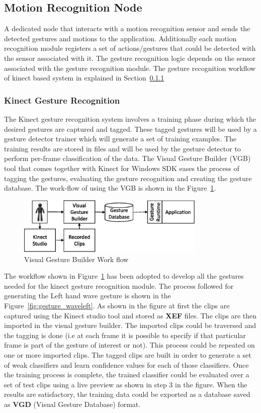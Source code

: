 \subsection{Motion Recognition Node} A dedicated node that interacts with a motion recognition sensor and sends the detected gestures and motions to the application. Additionally each motion recognition module registers a set of actions/gestures that could be detected with the sensor associated with it. The gesture recognition logic depends on the sensor associated with the gesture recognition module. The gesture recognition workflow of kinect based system in explained in Section~\ref{sssec:kinect_gestures}
\subsubsection{Kinect Gesture Recognition}
\label{sssec:kinect_gestures}
The Kinect gesture recognition system involves a training phase during which the desired gestures are captured and tagged. These tagged gestures will be used by a gesture detector trainer which will generate a set of training examples. The training results are stored in files and will be used by the gesture detector to perform per-frame classification of the data. The Visual Gesture Builder (VGB) tool that comes together with Kinect for Windows SDK eases the process of tagging the gestures, evaluating the gesture recognition and creating the gesture database. The work-flow of using the VGB is shown in the Figure~\ref{fig:vgb_workflow}.
\begin{figure}[H]
\centering
\includegraphics[width=0.8\textwidth]{assets/vgb_flow.eps}
\caption[Visual Gesture Builder Work flow]{Visual Gesture Builder Work flow \cite{KinectSDK2014}}
\label{fig:vgb_workflow}
\end{figure}
The workflow shown in Figure~\ref{fig:vgb_workflow} has been adopted to develop all the gestures needed for the kinect gesture recognition module. The process followed for generating the Left hand wave gesture is shown in the Figure~\ref{fig:gesture_waveleft}. As shown in the figure at first the clips are captured using the Kinect studio tool and  stored as \textbf{XEF} files. The clips are then imported in the visual gesture builder. The imported clips could be traversed and the tagging is done (i.e at each frame it is possible to specify if that particular frame is part of the gesture of interest or not). This process could be repeated on one or more imported clips. The tagged clips are built in order to generate a set of weak classifiers and learn confidence values for each of those classifiers. Once the training process is complete, the trained classifier could be evaluated over a set of test clips using a live preview as shown in step 3 in the figure. When the results are satisfactory, the training data could be exported as a database saved as \textbf{VGD} (Visual Gesture Database) format.
